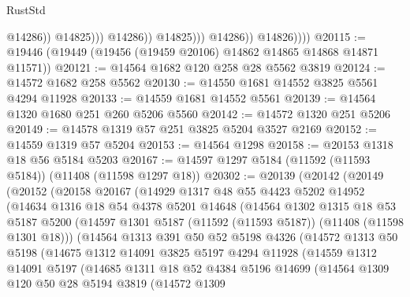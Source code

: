 \begin{lexlean}{RustStd}
\begin{coremodule}
                                    @14286))
                                @14825)))
                          @14286))
                      @14825)))
                @14286))
            @14826))))
@20115 := @19446 (@19449 (@19456 (@19459 @20106) @14862 @14865 @14868 @14871 @11571))
@20121 := @14564 @1682 @120 @258 @28 @5562 @3819
@20124 := @14572 @1682 @258 @5562
@20130 := @14550 @1681 @14552 @3825 @5561 @4294 @11928
@20133 := @14559 @1681 @14552 @5561
@20139 := @14564 @1320 @1680 @251 @260 @5206 @5560
@20142 := @14572 @1320 @251 @5206
@20149 := @14578 @1319 @57 @251 @3825 @5204 @3527 @2169
@20152 := @14559 @1319 @57 @5204
@20153 := @14564 @1298
@20158 := @20153 @1318 @18 @56 @5184 @5203
@20167 := @14597 @1297 @5184 (@11592 (@11593 @5184)) (@11408 (@11598 @1297 @18))
@20302 := @20139
    (@20142
      (@20149
        (@20152
          (@20158
            @20167
            (@14929
              @1317
              @48
              @55
              @4423
              @5202
              @14952
              (@14634
                @1316
                @18
                @54
                @4378
                @5201
                @14648
                (@14564
                  @1302
                  @1315
                  @18
                  @53
                  @5187
                  @5200
                  (@14597 @1301 @5187 (@11592 (@11593 @5187)) (@11408 (@11598 @1301 @18)))
                  (@14564
                    @1313
                    @391
                    @50
                    @52
                    @5198
                    @4326
                    (@14572
                      @1313
                      @50
                      @5198
                      (@14675
                        @1312
                        @14091
                        @3825
                        @5197
                        @4294
                        @11928
                        (@14559
                          @1312
                          @14091
                          @5197
                          (@14685
                            @1311
                            @18
                            @52
                            @4384
                            @5196
                            @14699
                            (@14564
                              @1309
                              @120
                              @50
                              @28
                              @5194
                              @3819
                              (@14572
                                @1309

\end{coremodule}
\end{lexlean}
